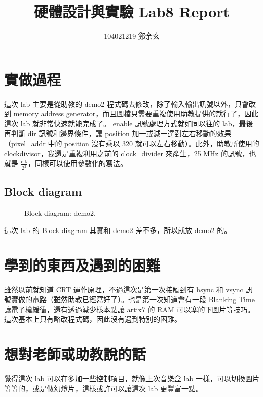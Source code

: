 \documentclass{article}
\begin{document}
\begin{CJK}{UTF8}{bsmi}
\title{硬體設計與實驗 Lab8 Report}
\author{104021219 鄭余玄}
\date{}
\maketitle
\section{實做過程}
這次 lab 主要是從助教的 demo2 程式碼去修改，除了輸入輸出訊號以外，只會改到 memory address generator，而且圖檔只需要重複使用助教提供的就行了，因此這次 lab 就非常快速就能完成了。 enable 訊號處理方式就如同以往的 lab，最後再判斷 dir 訊號和邊界條件，讓 position 加一或減一達到左右移動的效果（pixel\_addr 中的 position 沒有乘以 320 就可以左右移動）。此外，助教所使用的 clockdivisor，我還是重複利用之前的 clock\_divider 來產生，25 MHz 的訊號，也就是 $\frac{\text{clk}}{2^2}$，同樣可以使用參數化的寫法。

\subsection{Block diagram}
\begin{figure}[h]
\caption{Block diagram: demo2.}
\end{figure}
這次 lab 的 Block diagram 其實和 demo2 差不多，所以就放 demo2 的。

\section{學到的東西及遇到的困難}
雖然以前就知道 CRT 運作原理，不過這次是第一次接觸到有 hsync 和 vsync 訊號實做的電路（雖然助教已經寫好了）。也是第一次知道會有一段 Blanking Time 讓電子槍緩衝，還有透過減少樣本點讓 artix7 的 RAM 可以塞的下圖片等技巧。這次基本上只有略改程式碼，因此沒有遇到特別的困難。

\section{想對老師或助教說的話}
覺得這次 lab 可以在多加一些控制項目，就像上次音樂盒 lab 一樣，可以切換圖片等等的，或是做幻燈片，這樣或許可以讓這次 lab 更豐富一點。

\end{CJK}
\end{document}
